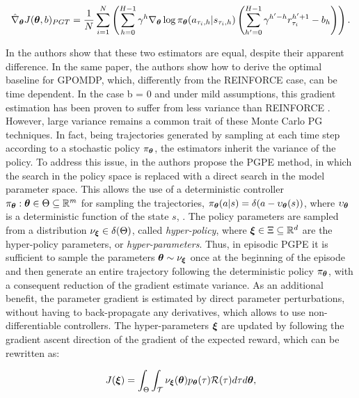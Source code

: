 \begin{align}
\hat{\nabla}_{\boldsymbol{\theta}}J(\boldsymbol{\theta}, b)_{PGT} = \frac{1}{N}\sum_{i=1}^{N}\left(\sum_{h=0}^{H-1}\gamma^h\nabla_{\boldsymbol{\theta}}\log\pi_{\boldsymbol{\theta}}(a_{\tau_i,h}|s_{\tau_i,h})\left(\sum_{h'=0}^{H-1}\gamma^{h'-h}r^{h'+1}_{\tau_i} - b_h\right)\right).
\end{align}

In \cite{peters2008reinforcement} the authors show that these two estimators are equal, despite their apparent difference. In the same paper, the authors show how to derive the optimal baseline for \gls{GPOMDP}, which, differently from the  REINFORCE case, can be time dependent. In the case b = 0 and under mild assumptions, this gradient estimation has been proven to suffer from less variance than REINFORCE \cite{zhao2011analysis}. However, large variance remains a common trait of these Monte Carlo \gls{PG} techniques. In fact, being trajectories generated by sampling at each time step according to a stochastic policy $\pi_{\boldsymbol{\theta}}$, the estimators inherit the variance of the policy. To address this
issue, in \cite{sehnke2008policy} the authors propose the \gls{PGPE} method, in which the search in the policy space is replaced with a direct search in the model parameter space. This allows the use of a deterministic controller $\pi_{\boldsymbol{\theta}}: \boldsymbol{\theta}\in\Theta\subseteq\mathbb{R}^m$ for sampling the trajectories, \ie $\pi_{\boldsymbol{\theta}}(a|s)=\delta(a-\upsilon_{\boldsymbol{\theta}}(s))$, where $\upsilon_{\boldsymbol{\theta}}$ is a deterministic function of the state $s$, \eg \cite{sehnke2010parameter}. The policy parameters are sampled from a distribution $\nu_{\boldsymbol{\xi}}\in\delta(\Theta)$, called \emph{hyper-policy}, where $\boldsymbol{\xi}\in\Xi\subseteq\mathbb{R}^d$ are the hyper-policy parameters, or \emph{hyper-parameters}. Thus, in episodic \gls{PGPE} it is sufficient to sample the parameters $\boldsymbol{\theta}\sim\nu_{\boldsymbol{\xi}}$ once at the beginning of the episode and then generate an entire trajectory following the deterministic policy $\pi_{\boldsymbol{\theta}}$, with a consequent reduction of the gradient estimate variance. As an additional benefit, the parameter gradient is estimated by direct parameter perturbations, without having to back-propagate any derivatives, which allows to use non-differentiable controllers. The hyper-parameters $\boldsymbol{\xi}$ are updated by following the gradient ascent direction of the gradient of the expected reward, which can be rewritten as:

\begin{align}
J(\boldsymbol{\xi}) = \int_{\Theta}\int_{\mathcal{T}}\nu_{\boldsymbol{\xi}}(\boldsymbol{\theta})p_{\boldsymbol{\theta}}(\tau)\mathcal{R}(\tau)d\tau d\boldsymbol{\theta}, 
\end{align}

